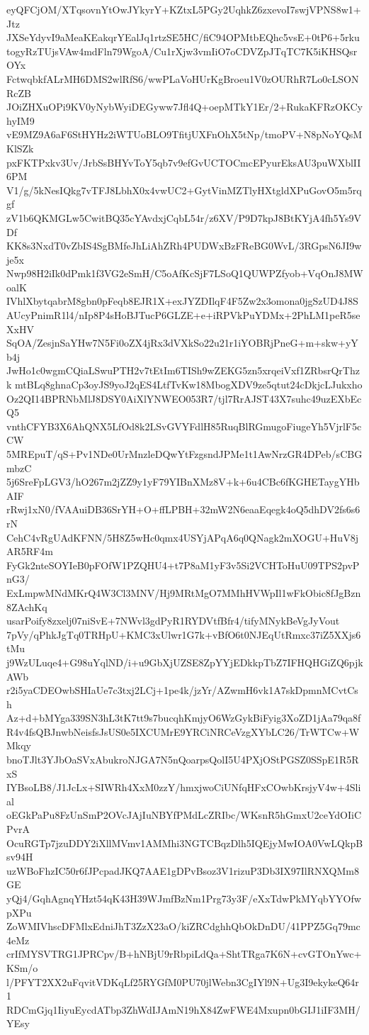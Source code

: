 eyQFCjOM/XTqsovnYtOwJYkyrY+KZtxL5PGy2UqhkZ6zxevoI7swjVPNS8w1+Jtz
JXSeYdyvI9aMeaKEakqrYEalJq1rtzSE5HC/fiC94OPMtbEQhc5vsE+0tP6+5rku
togyRzTUjsVAw4mdFln79WgoA/Cu1rXjw3vmIiO7oCDVZpJTqTC7K5iKHSQsrOYx
FctwqbkfALrMH6DMS2wlRfS6/wwPLaVoHUrKgBroeu1V0zOURhR7Lo0cLSONRcZB
JOiZHXuOPi9KV0yNybWyiDEGyww7Jfl4Q+oepMTkY1Er/2+RukaKFRzOKCyhyIM9
vE9MZ9A6aF6StHYHz2iWTUoBLO9TfitjUXFnOhX5tNp/tmoPV+N8pNoYQsMKlSZk
pxFKTPxkv3Uv/JrbSsBHYvToY5qb7v9efGvUCTOCmcEPyurEksAU3puWXblII6PM
V1/g/5kNesIQkg7vTFJ8LbhX0x4vwUC2+GytVinMZTlyHXtgldXPuGovO5m5rqgf
zV1b6QKMGLw5CwitBQ35cYAvdxjCqbL54r/z6XV/P9D7kpJ8BtKYjA4fh5Ys9VDf
KK8s3NxdT0vZbIS4SgBMfeJhLiAhZRh4PUDWxBzFReBG0WvL/3RGpsN6JI9wje5x
Nwp98H2iIk0dPmk1f3VG2eSmH/C5oAfKcSjF7LSoQ1QUWPZfyob+VqOnJ8MWoalK
IVhlXbytqabrM8gbn0pFeqb8EJR1X+exJYZDIlqF4F5Zw2x3omona0jgSzUD4J8S
AUcyPnimR1l4/nIp8P4sHoBJTucP6GLZE+e+iRPVkPuYDMx+2PhLM1peR5seXxHV
SqOA/ZesjnSaYHw7N5Fi0oZX4jRx3dVXkSo22u21r1iYOBRjPneG+m+skw+yYb4j
JwHo1c0wgmCQiaLSwuPTH2v7tEtIm6TISh9wZEKG5zn5xrqeiVxf1ZRbsrQrThzk
mtBLq8ghnaCp3oyJS9yoJ2qES4LtfTvKw18MbogXDV9ze5qtut24cDkjcLJukxho
Oz2QI14BPRNbMlJ8DSY0AiXlYNWEO053R7/tjl7RrAJST43X7suhc49uzEXbEcQ5
vnthCFYB3X6AhQNX5LfOd8k2LSvGVYFdlH85RuqBlRGmugoFiugeYh5VjrlF5cCW
5MREpuT/qS+Pv1NDe0UrMnzleDQwYtFzgsndJPMe1t1AwNrzGR4DPeb/sCBGmbzC
5j6SreFpLGV3/hO267m2jZZ9y1yF79YIBnXMz8V+k+6u4CBc6fKGHETaygYHbAIF
rRwj1xN0/fVAAuiDB36SrYH+O+ffLPBH+32mW2N6eaaEqegk4oQ5dhDV2fs6s6rN
CehC4vRgUAdKFNN/5H8Z5wHc0qmx4USYjAPqA6q0QNagk2mXOGU+HuV8jAR5RF4m
FyGk2nteSOYIeB0pFOfW1PZQHU4+t7P8aM1yF3v5Si2VCHToHuU09TPS2pvPnG3/
ExLmpwMNdMKrQ4W3Cl3MNV/Hj9MRtMgO7MMhHVWpIl1wFkObic8fJgBzn8ZAchKq
usarPoify8zxelj07niSvE+7NWvl3gdPyR1RYDVtfBfr4/tifyMNykBeVgJyVout
7pVy/qPhkJgTq0TRHpU+KMC3xUlwr1G7k+vBfO6t0NJEqUtRmxc37iZ5XXjs6tMu
j9WzULuqe4+G98uYqlND/i+u9GbXjUZSE8ZpYYjEDkkpTbZ7IFHQHGiZQ6pjkAWb
r2i5yaCDEOwbSHIaUe7c3txj2LCj+1pe4k/jzYr/AZwmH6vk1A7skDpmnMCvtCsh
Az+d+bMYga339SN3hL3tK7tt9s7bucqhKmjyO6WzGykBiFyig3XoZD1jAa79qa8f
R4v4fsQBJnwbNeisfsJsUS0e5IXCUMrE9YRCiNRCeVzgXYbLC26/TrWTCw+WMkqy
bnoTJlt3YJbOaSVxAbukroNJGA7N5nQoarpsQolI5U4PXjOStPGSZ0SSpE1R5RxS
IYBsoLB8/J1JcLx+SIWRh4XxM0zzY/hmxjwoCiUNfqHFxCOwbKrsjyV4w+4Slial
oEGkPaPu8FzUnSmP2OVcJAjIuNBYfPMdLcZRIbc/WKsnR5hGmxU2ceYdOIiCPvrA
OcuRGTp7jzuDDY2iXllMVmv1AMMhi3NGTCBqzDlh5IQEjyMwIOA0VwLQkpBsv94H
uzWBoFhzIC50r6fJPcpadJKQ7AAE1gDPvBsoz3V1rizuP3Db3IX97IlRNXQMm8GE
yQj4/GqhAgnqYHzt54qK43H39WJmfBzNm1Prg73y3F/eXxTdwPkMYqbYYOfwpXPu
ZoWMIVhscDFMlxEdniJhT3ZzX23aO/kiZRCdghhQbOkDnDU/41PPZ5Gq79mc4eMz
crIfMYSVTRG1JPRCpv/B+hNBjU9rRbpiLdQa+ShtTRga7K6N+cvGTOnYwc+KSm/o
l/PFYT2XX2uFqvitVDKqLf25RYGfM0PU70jlWebn3CgIYl9N+Ug3I9ekykeQ64r1
RDCmGjq1IiyuEycdATbp3ZhWdIJAmN19hX84ZwFWE4Mxupn0bGIJ1iIF3MH/YEsy
